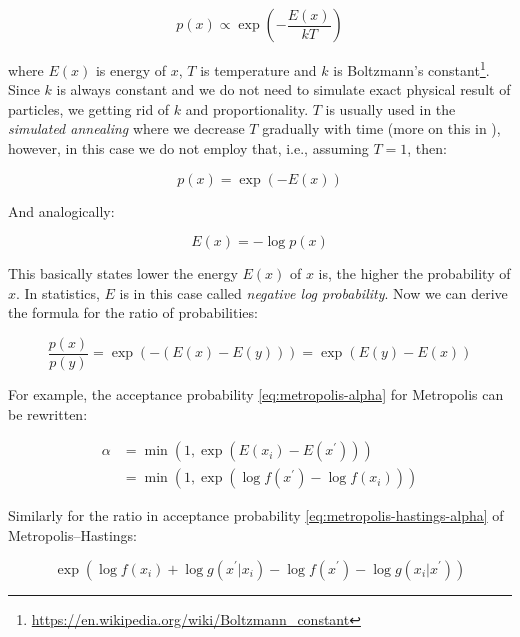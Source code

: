 \documentclass[
  digital, %
  oneside, %
  lof,     %
  lot,     %
]{fithesis4}
\begin{document}
\begin{equation}\label{eq:boltzmann-factor-prop}
  p(x) \propto \exp \left( -\frac{E(x)}{kT} \right)
\end{equation}

where $E(x)$ is energy of $x$, $T$ is temperature and $k$ is Boltzmann's constant\footnote{\url{https://en.wikipedia.org/wiki/Boltzmann_constant}}.
Since $k$ is always constant and we do not need to simulate exact physical result of particles, we getting rid of $k$ and proportionality.
$T$ is usually used in the \textit{simulated annealing} where we decrease $T$ gradually with time (more on this in \cite[Chapter 8]{murphy2021}), however, in this case we do not employ that, i.e., assuming $T = 1$, then:

\begin{equation}\label{eq:boltzmann-factor-prob}
  p(x) = \exp \left( -E(x) \right)
\end{equation}

And analogically:

\begin{equation}\label{eq:boltzmann-factor-neg-log}
  E(x) = -\log p(x)
\end{equation}

This basically states lower the energy $E(x)$ of $x$ is, the higher the probability of $x$.
In statistics, $E$ is in this case called \textit{negative log probability}.
Now we can derive the formula for the ratio of probabilities:

\begin{equation}
  \frac{p(x)}{p(y)} = \exp \left( -(E(x) - E(y)) \right) = \exp \left( E(y) - E(x) \right)
\end{equation}

For example, the acceptance probability \eqref{eq:metropolis-alpha} for Metropolis can be rewritten:

\begin{equation}
  \begin{split}
    \alpha &= \min \left(
    1, 
    \exp\left( 
      E(x_{i}) - E(x^\prime)
    \right) 
  \right) \\
  & = \min \left(
    1, 
    \exp\left( 
      \log f(x^\prime) - \log f(x_{i})
    \right) 
  \right)
  \end{split}
\end{equation}

Similarly for the ratio in acceptance probability \eqref{eq:metropolis-hastings-alpha} of Metropolis–Hastings:

\begin{equation}
  \exp \left( \log f(x_{i}) + \log g(x^{\prime} | x_{i}) - \log f(x^\prime) - \log g(x_{i} | x^{\prime}) \right)
\end{equation}
\end{document}
